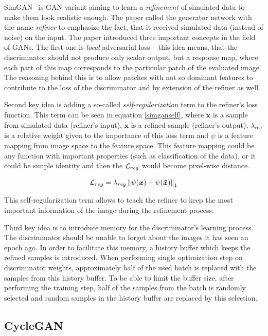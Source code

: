 SimGAN~\cite{historypool} is GAN variant aiming to learn a {\em refinement} of simulated data to make them look realistic enough. The paper called the generator network with the name {\em refiner} to emphasize the fact, that it received simulated data (instead of noise) on the input. The paper introduced three important concepts in the field of GANs. The first one is {\em local} adversarial loss -- this idea means, that the discriminator should not produce only scalar output, but a response map, where each part of this map corresponds to the particular patch of the evaluated image. The reasoning behind this is to allow patches with not so dominant features to contribute to the loss of the discriminator and by extension of the refiner as well.

Second key idea is adding a so-called {\em self-regularization} term to the refiner's loss function. This term can be seen in equation \ref{simganself}, where $\bm{x}$ is a sample from simulated data (refiner's input), $\bm{\tilde{x}}$ is a refined sample (refiner's output), $\lambda_{reg}$ is a relative weight given to the importance of this loss term and $\psi$ is a feature mapping from image space to the feature space. This feature mapping could be any function with important properties (such as classification of the data), or it could be simple identity and then the $\mathcal{L}_{reg}$ would become pixel-wise distance.

\begin{equation}
\mathcal{L}_{reg} = \lambda_{reg}\left\lVert\psi({\bm{x}}) - \psi({\bm{\tilde{x}}})\right\rVert_1
\label{simganself}
\end{equation}

This self-regularization term allows to teach the refiner to keep the most important information of the image during the refinement process.

Third key idea is to introduce memory for the discriminator's learning process. The discriminator should be unable to forget about the images it has seen an epoch ago. In order to facilitate this memory, a history buffer which keeps the refined samples is introduced. When performing single optimization step on discriminator weights, approximately half of the used batch is replaced with the samples from this history buffer. To be able to limit the buffer size, after performing the training step, half of the samples from the batch is randomly selected and random samples in the history buffer are replaced by this selection.

\subsection{CycleGAN} \label{cyclegan}

